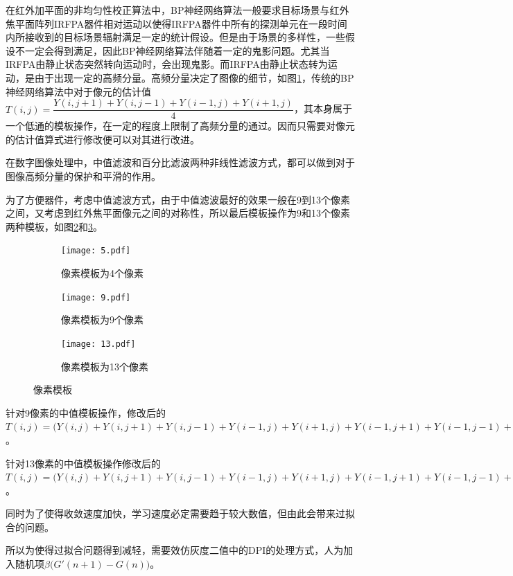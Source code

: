 \documentclass{article}
\newcounter{sub}
\begin{document}
在红外加平面的非均匀性校正算法中，BP神经网络算法一般要求目标场景与红外焦平面阵列IRFPA器件相对运动以使得IRFPA器件中所有的探测单元在一段时间内所接收到的目标场景辐射满足一定的统计假设。但是由于场景的多样性，一些假设不一定会得到满足，因此BP神经网络算法伴随着一定的鬼影问题。尤其当IRFPA由静止状态突然转向运动时，会出现鬼影。而IRFPA由静止状态转为运动，是由于出现一定的高频分量。高频分量决定了图像的细节，如图\ref{fig:像素模板为4个像素}，传统的BP神经网络算法中对于像元的估计值$ T(i,j)= \dfrac{Y(i,j+1)+Y(i,j-1)+Y(i-1,j)+Y(i+1,j)}{4} $，其本身属于一个低通的模板操作，在一定的程度上限制了高频分量的通过。因而只需要对像元的估计值算式进行修改便可以对其进行改进。

在数字图像处理中，中值滤波和百分比滤波两种非线性滤波方式，都可以做到对于图像高频分量的保护和平滑的作用。

为了方便器件，考虑中值滤波方式，由于中值滤波最好的效果一般在9到13个像素之间，又考虑到红外焦平面像元之间的对称性，所以最后模板操作为9和13个像素两种模板，如图\ref{fig:像素模板为9个像素}和\ref{fig:像素模板为13个像素}。

\begin{figure}[htpb]
	\centering
	\begin{subfigure}[htpb]{.3\linewidth}
		\centering
		\texttt{[image: 5.pdf]}
		\caption{像素模板为4个像素}
		\label{fig:像素模板为4个像素}
	\end{subfigure}
	\quad
	\begin{subfigure}[htpb]{.3\linewidth}
		\centering
		\texttt{[image: 9.pdf]}
		\caption{像素模板为9个像素}
		\label{fig:像素模板为9个像素}
	\end{subfigure}
	\quad
	\begin{subfigure}[htpb]{.3\linewidth}
		\centering
		\texttt{[image: 13.pdf]}
		\caption{像素模板为13个像素}
		\label{fig:像素模板为13个像素}
	\end{subfigure}
	\caption{像素模板}
	\label{fig:像素模板}
\end{figure}

针对9像素的中值模板操作，修改后的$ T(i,j)= \big(Y(i,j)+Y(i,j+1)+Y(i,j-1)+Y(i-1,j)+Y(i+1,j)+Y(i-1,j+1)+Y(i-1,j-1)+Y(i+1,j+1)+Y(i+1,j-1)\big)/9 $。

针对13像素的中值模板操作修改后的$ T(i,j)= \big(Y(i,j)+Y(i,j+1)+Y(i,j-1)+Y(i-1,j)+Y(i+1,j)+Y(i-1,j+1)+Y(i-1,j-1)+Y(i+1,j+1)+Y(i+1,j-1)+Y(i,j+2)+Y(i,j-2)+Y(i-2,j)+Y(i+2,j)\big)/13 $。

同时为了使得收敛速度加快，学习速度必定需要趋于较大数值，但由此会带来过拟合的问题。

所以为使得过拟合问题得到减轻，需要效仿灰度二值中的DPI的处理方式，人为加入随机项$ \beta \big(G'(n+1)-G(n)\big) $。
\end{document}

